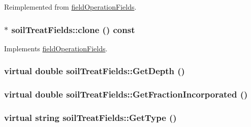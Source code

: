 Reimplemented from \hyperlink{classfield_operation_fields_aeb2bce9d4612033dbab366d870e432a6}{fieldOperationFields}.\hypertarget{classsoil_treat_fields_ac7a0bac794823169aaa85319842ce4d9}{
\subsubsection[{clone}]{ $\ast$ soilTreatFields::clone () const}}
\label{classsoil_treat_fields_ac7a0bac794823169aaa85319842ce4d9}


Implements \hyperlink{classfield_operation_fields_ae5d8585b7e57196ce3801eed29677b3e}{fieldOperationFields}.\hypertarget{classsoil_treat_fields_a4911e157230f7e676f8477ca4cedf2d6}{
\subsubsection[{GetDepth}]{\setlength{\rightskip}{0pt plus 5cm}virtual double soilTreatFields::GetDepth ()}}
\label{classsoil_treat_fields_a4911e157230f7e676f8477ca4cedf2d6}
\hypertarget{classsoil_treat_fields_adb3f2983e379667290a90d19463112a4}{
\subsubsection[{GetFractionIncorporated}]{\setlength{\rightskip}{0pt plus 5cm}virtual double soilTreatFields::GetFractionIncorporated ()}}
\label{classsoil_treat_fields_adb3f2983e379667290a90d19463112a4}
\hypertarget{classsoil_treat_fields_a575166b12e7900f9b321b2ac1ad8e1ea}{
\subsubsection[{GetType}]{\setlength{\rightskip}{0pt plus 5cm}virtual string soilTreatFields::GetType ()}}
